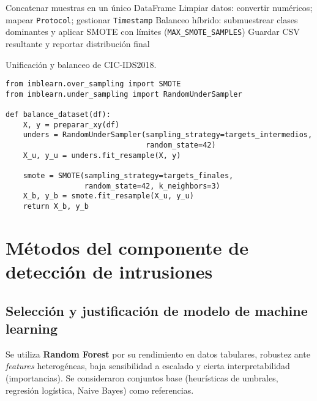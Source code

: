 \begin{algorithm}[H]
\SetAlgoLined
{}
Concatenar muestras en un único DataFrame\;
Limpiar datos: convertir numéricos; mapear \texttt{Protocol}; gestionar \texttt{Timestamp}\;
Balanceo híbrido: submuestrear clases dominantes y aplicar SMOTE con límites (\texttt{MAX\_SMOTE\_SAMPLES})\;
Guardar CSV resultante y reportar distribución final\;
\caption{Unificación y balanceo de CIC‑IDS2018.}
\label{alg:unify_balance}
\end{algorithm}


\begin{lstlisting}[style=tfgpython,caption={Balanceo híbrido (esqueleto simplificado)},label=List.HybridBalance]
from imblearn.over_sampling import SMOTE
from imblearn.under_sampling import RandomUnderSampler

def balance_dataset(df):
    X, y = preparar_xy(df)
    unders = RandomUnderSampler(sampling_strategy=targets_intermedios,
                                random_state=42)
    X_u, y_u = unders.fit_resample(X, y)

    smote = SMOTE(sampling_strategy=targets_finales,
                  random_state=42, k_neighbors=3)
    X_b, y_b = smote.fit_resample(X_u, y_u)
    return X_b, y_b
\end{lstlisting}


\section{Métodos del componente de detección de intrusiones}
\subsection{Selección y justificación de modelo de machine learning}
Se utiliza \textbf{Random Forest} por su rendimiento en datos tabulares, robustez ante \textit{features} heterogéneas, baja sensibilidad a escalado y cierta interpretabilidad (importancias). Se consideraron conjuntos base (heurísticas de umbrales, regresión logística, Naive Bayes) como referencias.

